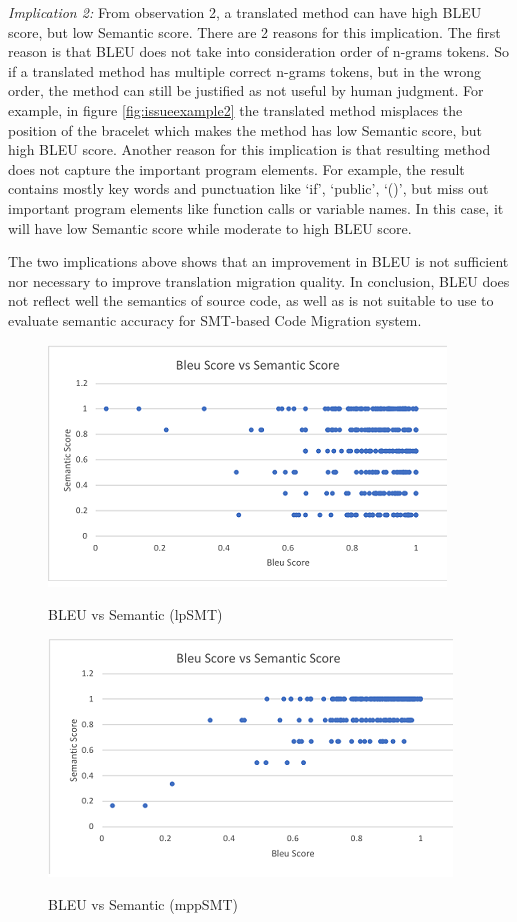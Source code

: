 \emph{Implication 2: }From observation 2, a translated method can have high BLEU score, but low Semantic score. There are 2 reasons for this implication. The first reason is that BLEU does not take into consideration order of n-grams tokens. So if a translated method has multiple correct n-grams tokens, but in the wrong order, the method can still be justified as not useful by human judgment. For example, in figure \ref{fig:issueexample2} the translated method misplaces the position of the bracelet which makes the method has low Semantic score, but high BLEU score. Another reason for this implication is that resulting method does not capture the important program elements. For example, the result contains mostly key words and punctuation like \lq if\rq, \lq public\rq, \lq()\rq, but miss out important program elements like function calls or variable names. In this case, it will have low Semantic score while moderate to high BLEU score. 

The two implications above shows that an improvement in BLEU is not sufficient nor necessary to improve translation migration quality. In conclusion, BLEU does not reflect well the semantics of source code, as well as is not suitable to use to evaluate semantic accuracy for SMT-based Code Migration system.

 
\begin{figure}
\caption{BLEU vs Semantic (lpSMT)}
\centering
\includegraphics{img/bleuvssemantic_lpSMT.png}
\label{fig:BleuSemlpSMT}
\end{figure}

\begin{figure}
\caption{BLEU vs Semantic (mppSMT)}
\centering
\includegraphics{img/bleuvssemantic_mppSMT.png}
\label{fig:BleuSemMppSMT}
\end{figure}

